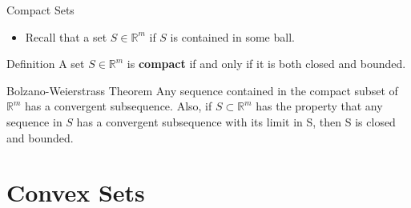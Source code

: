 \documentclass{beamer}
\begin{document}
\begin{frame}{Compact Sets}
    \begin{itemize}
        \item Recall that a set $S\in \mathbb{R}^m$ if $S$ is contained in some ball. 
    \end{itemize}
    \begin{block}{Definition}
    A set $S\in \mathbb{R}^m$ is \textbf{compact} if and only if it is both closed and bounded.  
    \end{block}
    \begin{block}{Bolzano-Weierstrass Theorem}
    Any sequence contained in the compact subset of $\mathbb{R}^m$ has a convergent subsequence. Also, if $S\subset \mathbb{R}^m$ has the property that any sequence in $S$ has a convergent subsequence with its limit in S, then S is closed and bounded.  
    
    
    \end{block}
\end{frame}
\section{Convex Sets}
\end{document}
